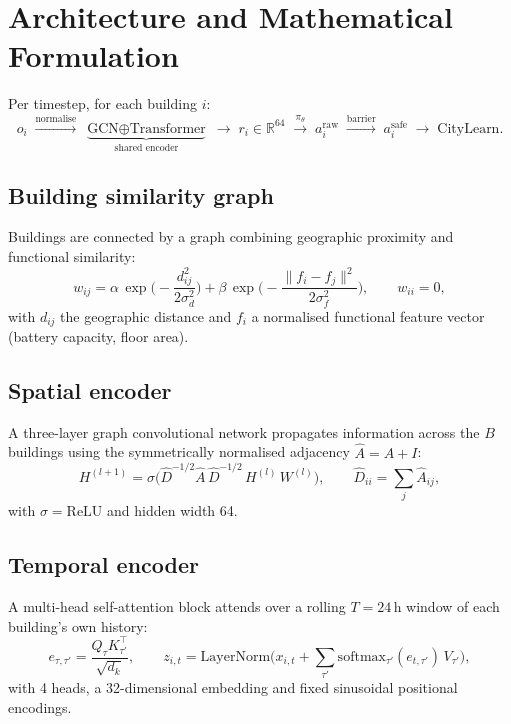 \documentclass[11pt]{article}
\newcommand{\R}{\mathbb{R}}
\begin{document}
\section{Architecture and Mathematical Formulation}
\label{sec:stems}

Per timestep, for each building $i$:
$$
o_i \;\xrightarrow{\text{normalise}}\;
\underbrace{\text{GCN} \oplus \text{Transformer}}_{\text{shared encoder}}
\;\to\; r_i \in \R^{64} \;\xrightarrow{\pi_\theta}\; a_i^{\text{raw}}
\;\xrightarrow{\text{barrier}}\; a_i^{\text{safe}} \;\to\; \text{CityLearn}.
$$

\subsection{Building similarity graph}

Buildings are connected by a graph combining geographic proximity and functional
similarity:
\begin{equation}
w_{ij} = \alpha\, \exp\!\Big(-\frac{d_{ij}^2}{2\sigma_d^2}\Big) + \beta\, \exp\!\Big(-\frac{\|f_i - f_j\|^2}{2\sigma_f^2}\Big), \qquad w_{ii} = 0,
\label{eq:graph}
\end{equation}
with $d_{ij}$ the geographic distance and $f_i$ a normalised functional feature
vector (battery capacity, floor area).

\subsection{Spatial encoder}

A three-layer graph convolutional network propagates information across the $B$
buildings using the symmetrically normalised adjacency $\hat A = A + I$:
\begin{equation}
H^{(l+1)} = \sigma\!\Big(\hat D^{-1/2} \hat A\, \hat D^{-1/2}\, H^{(l)}\, W^{(l)}\Big), \qquad \hat D_{ii} = \sum_j \hat A_{ij},
\label{eq:gcn}
\end{equation}
with $\sigma = \mathrm{ReLU}$ and hidden width 64.

\subsection{Temporal encoder}

A multi-head self-attention block attends over a rolling $T=24$\,h window of each
building's own history:
\begin{equation}
e_{\tau,\tau'} = \frac{Q_\tau K_{\tau'}^\top}{\sqrt{d_k}}, \qquad
z_{i,t} = \mathrm{LayerNorm}\Big(x_{i,t} + \sum_{\tau'} \mathrm{softmax}_{\tau'}(e_{t,\tau'})\, V_{\tau'}\Big),
\label{eq:transformer}
\end{equation}
with 4 heads, a 32-dimensional embedding and fixed sinusoidal positional
encodings.
\end{document}

